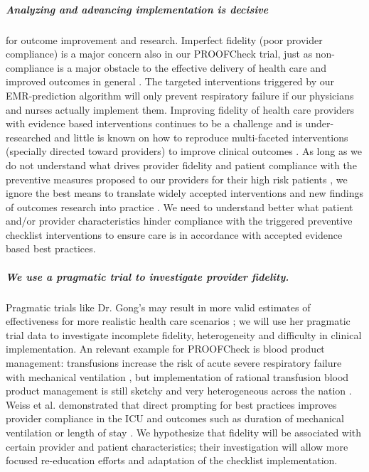 \documentclass[11pt,notitlepage]{article}
\begin{document}
\subparagraph*{Analyzing and advancing implementation is decisive} for outcome improvement and research. Imperfect fidelity (poor provider compliance) is a major concern also in our PROOFCheck trial, just as non-compliance is a major obstacle to the effective delivery of health care and improved outcomes in general
\cite{Duncan_16710766}. The targeted interventions triggered by our EMR-prediction algorithm will only prevent respiratory failure if our physicians and nurses actually implement them. Improving fidelity of health care providers with evidence based interventions continues to be a challenge and is under-researched \cite{Davis_7650822} and little is known on how to reproduce multi-faceted interventions (specially directed toward providers) to improve clinical outcomes \cite{Campbell_10987780}. As long as we do not understand what drives provider fidelity and patient compliance with the preventive measures proposed to our providers for their high risk patients  \cite{Mittman_15172904}, we ignore the best means to translate widely accepted interventions and new findings of outcomes research into practice \cite{Glasgow_17150029}. We need to understand better what patient and/or provider characteristics hinder compliance with the triggered preventive checklist interventions to ensure care is in accordance with accepted evidence based best practices.

\subparagraph*{We use a pragmatic trial to investigate provider fidelity.} Pragmatic trials like Dr. Gong's may result in more valid estimates of effectiveness for more realistic health care scenarios \cite{Selby_22824225,Tosh_21842618}; we will use her pragmatic trial data to investigate incomplete fidelity, heterogeneity and difficulty in clinical implementation. An relevant example for PROOFCheck is blood product management: transfusions increase the risk of acute severe respiratory failure with mechanical ventilation \cite{Kenz_24892308}, but implementation of rational transfusion blood product management is still sketchy and very heterogeneous across the nation \cite{Likosky_20488928}. Weiss et al. demonstrated that direct prompting for best practices improves provider compliance in the ICU and outcomes such as duration of mechanical ventilation or length of stay \cite{Weiss_21616996}. We hypothesize that fidelity will be associated with certain provider and patient characteristics; their investigation will allow more focused re-education efforts and adaptation of the checklist implementation. 
\end{document}
